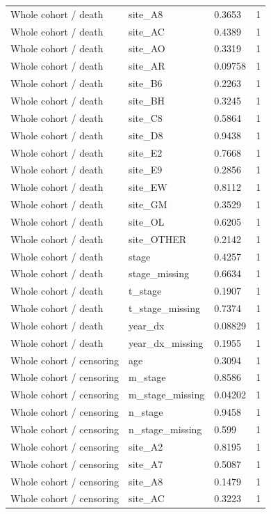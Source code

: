 \documentclass[12pt,letterpaper]{article}
\begin{document}
\begin{longtable}{p{1.55in}p{2.25in}p{0.9in}p{1.1in}}
Whole cohort / death & site\_A8 & 0.3653 & 1 \\
Whole cohort / death & site\_AC & 0.4389 & 1 \\
Whole cohort / death & site\_AO & 0.3319 & 1 \\
Whole cohort / death & site\_AR & 0.09758 & 1 \\
Whole cohort / death & site\_B6 & 0.2263 & 1 \\
Whole cohort / death & site\_BH & 0.3245 & 1 \\
Whole cohort / death & site\_C8 & 0.5864 & 1 \\
Whole cohort / death & site\_D8 & 0.9438 & 1 \\
Whole cohort / death & site\_E2 & 0.7668 & 1 \\
Whole cohort / death & site\_E9 & 0.2856 & 1 \\
Whole cohort / death & site\_EW & 0.8112 & 1 \\
Whole cohort / death & site\_GM & 0.3529 & 1 \\
Whole cohort / death & site\_OL & 0.6205 & 1 \\
Whole cohort / death & site\_OTHER & 0.2142 & 1 \\
Whole cohort / death & stage & 0.4257 & 1 \\
Whole cohort / death & stage\_missing & 0.6634 & 1 \\
Whole cohort / death & t\_stage & 0.1907 & 1 \\
Whole cohort / death & t\_stage\_missing & 0.7374 & 1 \\
Whole cohort / death & year\_dx & 0.08829 & 1 \\
Whole cohort / death & year\_dx\_missing & 0.1955 & 1 \\
Whole cohort / censoring & age & 0.3094 & 1 \\
Whole cohort / censoring & m\_stage & 0.8586 & 1 \\
Whole cohort / censoring & m\_stage\_missing & 0.04202 & 1 \\
Whole cohort / censoring & n\_stage & 0.9458 & 1 \\
Whole cohort / censoring & n\_stage\_missing & 0.599 & 1 \\
Whole cohort / censoring & site\_A2 & 0.8195 & 1 \\
Whole cohort / censoring & site\_A7 & 0.5087 & 1 \\
Whole cohort / censoring & site\_A8 & 0.1479 & 1 \\
Whole cohort / censoring & site\_AC & 0.3223 & 1 \\

\end{longtable}
\end{document}
